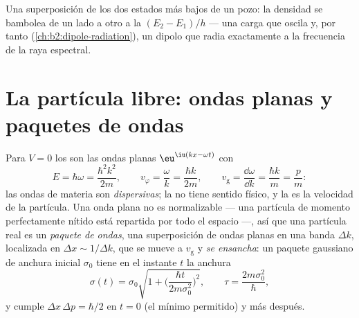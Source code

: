 \begin{omfigure}

{\small Una superposición de los dos estados más bajos de un pozo: la
densidad se bambolea de un lado a otro a la 
$(E_2 - E_1)/h$ --- una carga que oscila y, por tanto (\cref{ch:b2:dipole-radiation}),
un dipolo que radia exactamente a la frecuencia de la raya espectral.}
\end{omfigure}

\section{La partícula libre: ondas planas y paquetes de ondas}

\begin{proposition}\label{prop:b2:schrodinger-wave-functions:free}
Para $V = 0$ los  son las ondas planas $\eu^{\iu(kx -
\omega t)}$ con
\[
E = \hbar\omega = \frac{\hbar^2k^2}{2m}, \qquad
v_\varphi = \frac{\omega}{k} = \frac{\hbar k}{2m}, \qquad
v_{\text{g}} = \frac{\dd\omega}{\dd k} = \frac{\hbar k}{m} = \frac{p}{m} :
\]
las ondas de materia son \emph{dispersivas}; la  no tiene
sentido físico, y la \emph{} es la velocidad de la partícula. Una onda
plana no es normalizable --- una partícula de momento perfectamente nítido está
repartida por todo el espacio ---, así que una partícula real es un \emph{paquete
de ondas}, una superposición de ondas planas en una banda
$\Delta k$, localizada en $\Delta x \sim 1/\Delta k$, que se mueve a $v_{\text{g}}$ y
\emph{se ensancha}: un paquete gaussiano de anchura inicial $\sigma_0$ tiene en el
instante $t$ la anchura
\[
\sigma(t) = \sigma_0\sqrt{1 + \Big(\frac{\hbar t}{2m\sigma_0^2}\Big)^2}, \qquad
\tau = \frac{2m\sigma_0^2}{\hbar} ,
\]
y cumple $\Delta x\,\Delta p = \hbar/2$ en $t = 0$ (el mínimo permitido)
y más después.
\end{proposition}

